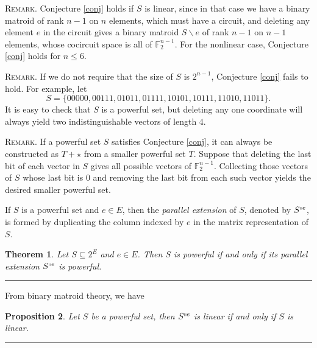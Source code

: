 \documentclass[12pt]{article}
\newtheorem{thm}{Theorem}[section]
\newtheorem{pro}[thm]{Proposition}
\def\qed{\hfill \rule{4pt}{7pt}}
\begin{document}
\textsc{Remark.}  Conjecture \ref{conj} holds if $S$ is linear, since in that case we have
a binary matroid of rank $n-1$ on $n$ elements, which must have a circuit, and deleting
any element $e$ in the circuit gives a binary matroid $S\backslash e$ of rank $n-1$ on $n-1$
elements, whose cocircuit space is all of $\mathbb{F}_2^{n-1}$.
For the nonlinear case, Conjecture \ref{conj} holds for $n\le6$.

\textsc{Remark.} If we do not require that the size of $S$ is $2^{n-1}$, Conjecture \ref{conj} fails to hold. For example, let \[S=\{00000,00111,01011,01111,10101,10111,11010,11011\}.\]
It is easy to check that $S$ is a powerful set, but deleting any one coordinate will always yield two indistinguishable vectors of length $4$.

\textsc{Remark.} If a powerful set $S$ satisfies Conjecture \ref{conj}, it can always be constructed as $T+\star$ from a smaller powerful set $T$.  Suppose that deleting the last bit of each vector in $S$ gives all possible vectors of $\mathbb{F}_2^{n-1}$.  Collecting those vectors of $S$ whose last bit is $0$ and removing the last bit from each such vector yields the desired smaller powerful set.

If $S$ is a powerful set and $e\in E$, then the \textit{parallel extension}
of $S$, denoted by $S^{\shortparallel e}$, is formed by duplicating the column indexed by $e$ in the matrix representation of $S$.

\begin{thm}
Let $S\subseteq2^E$ and $e\in E$.  Then $S$ is powerful if and only if
its parallel extension $S^{\shortparallel e}$ is powerful.
\qed
\end{thm}

From binary matroid theory, we have

\begin{pro}
Let $S$ be a powerful set, then $S^{\shortparallel e}$ is linear if and only if $S$ is linear.
\qed
\end{pro}

%


\end{document}
